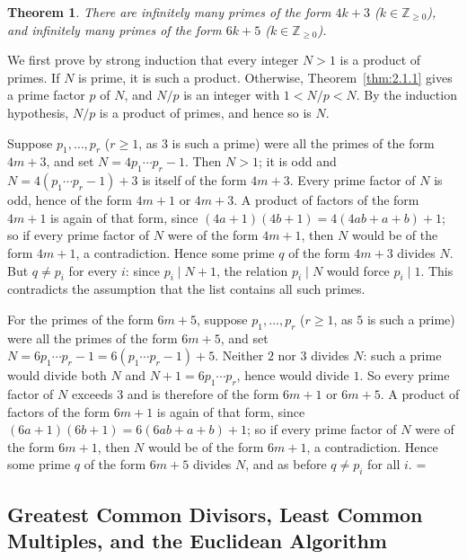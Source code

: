 \documentclass[11pt]{article}
\makeatletter
\theoremstyle{ntstyle}
\newtheorem{theorem}{Theorem}[subsection]
\let\nt@closedisplay\]
\def\nt@guardedclose{\@ifnextchar\par{\nt@closeafterpar}{\@ifnextchar\end{\postdisplaypenalty\@M\nt@closedisplay}{\nt@closedisplay}}}
\def\nt@closeafterpar\par{\@ifnextchar\par{\nt@closeafterpar}{\@ifnextchar\end{\postdisplaypenalty\@M\nt@closedisplay\par}{\nt@closedisplay\par}}}
\renewenvironment{proof}[1][\proofname]{\par
  \pushQED{\qed}\normalfont\topsep\medskipamount\edef\nt@afterproof{\@endparpenalty=\the\@endparpenalty\relax}\@beginparpenalty\@M\@endparpenalty\@M\let\]\nt@guardedclose\trivlist\item[]\textit{#1\@addpunct{.}} \ignorespaces}{\ifvmode\addpenalty\@M\fi\popQED\nt@afterproof\endtrivlist\@endpefalse}
\makeatother
\begin{document}
\begin{theorem}\label{thm:2.1.3}
	There are infinitely many primes of the form $4k+3$ ($k\in\mathbb{Z}_{\ge0}$), and infinitely many
	primes of the form $6k+5$ ($k\in\mathbb{Z}_{\ge0}$).
\end{theorem}

\begin{proof} We first prove by strong induction that every integer $N>1$ is a
	product of primes. If $N$ is prime, it is such a product. Otherwise,
	Theorem~\ref{thm:2.1.1} gives a prime factor $p$ of $N$, and $N/p$ is
	an integer with $1<N/p<N$. By the induction hypothesis, $N/p$ is a
	product of primes, and hence so is $N$.

	Suppose $p_1,\ldots,p_r$ ($r\ge1$, as $3$ is such a prime) were all the primes
	of the form $4m+3$, and set $N=4p_1\cdots p_r-1$. Then $N>1$; it is odd and
	$N=4(p_1\cdots p_r-1)+3$ is itself of the form $4m+3$. Every prime factor
	of $N$ is odd, hence of the form $4m+1$ or $4m+3$. A product of factors
	of the form $4m+1$ is again of that form, since
	$(4a+1)(4b+1)=4(4ab+a+b)+1$; so if every prime factor of $N$ were of the
	form $4m+1$, then $N$ would be of the form $4m+1$, a contradiction. Hence
	some prime $q$ of the form $4m+3$ divides $N$. But $q\neq p_i$ for every $i$: since $p_i\mid N+1$,
	the relation $p_i\mid N$ would force $p_i\mid1$. This contradicts the assumption that the list
	contains all such primes.

	For the primes of the form $6m+5$, suppose $p_1,\ldots,p_r$ ($r\ge1$, as $5$ is such a prime) were
	all the primes of the
	form $6m+5$, and set $N=6p_1\cdots p_r-1=6(p_1\cdots p_r-1)+5$. Neither
	$2$ nor $3$ divides $N$: such a prime would divide both $N$ and
	$N+1=6p_1\cdots p_r$, hence would divide $1$. So every prime factor of
	$N$ exceeds $3$ and is therefore of the form $6m+1$ or $6m+5$. A product
	of factors of the form $6m+1$ is again of that form, since
	$(6a+1)(6b+1)=6(6ab+a+b)+1$; so if every prime factor of $N$ were of the
	form $6m+1$, then $N$ would be of the form $6m+1$, a contradiction. Hence
	some prime $q$ of the form $6m+5$ divides $N$, and as before $q\neq p_i$
	for all $i$.\qedhere
\end{proof}
\subsection{Greatest Common Divisors, Least Common Multiples, and the Euclidean Algorithm}
\end{document}
